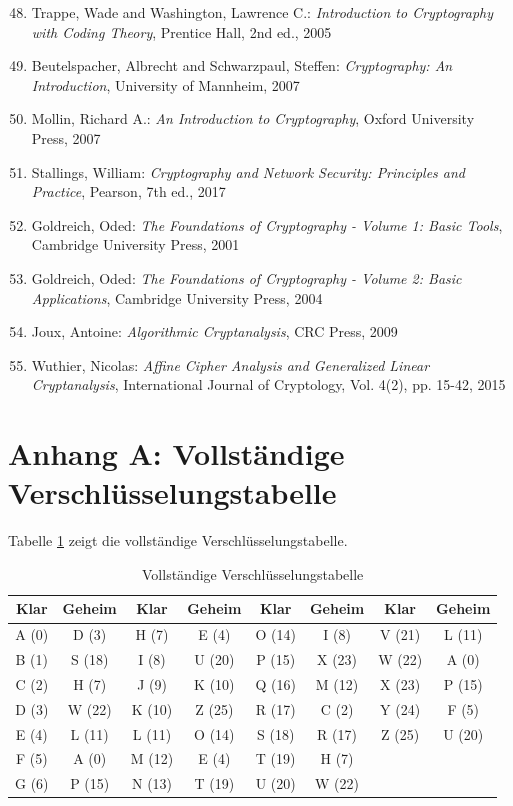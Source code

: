 ﻿\documentclass[12pt,a4paper]{article}
\begin{document}
	\begin{enumerate}
		\setcounter{enumi}{47}
		\item Trappe, Wade and Washington, Lawrence C.: \textit{Introduction to Cryptography with Coding Theory}, Prentice Hall, 2nd ed., 2005
		\item Beutelspacher, Albrecht and Schwarzpaul, Steffen: \textit{Cryptography: An Introduction}, University of Mannheim, 2007
		\item Mollin, Richard A.: \textit{An Introduction to Cryptography}, Oxford University Press, 2007
		\item Stallings, William: \textit{Cryptography and Network Security: Principles and Practice}, Pearson, 7th ed., 2017
	\end{enumerate}
	
	\begin{enumerate}
		\setcounter{enumi}{51}
		\item Goldreich, Oded: \textit{The Foundations of Cryptography - Volume 1: Basic Tools}, Cambridge University Press, 2001
		\item Goldreich, Oded: \textit{The Foundations of Cryptography - Volume 2: Basic Applications}, Cambridge University Press, 2004
		\item Joux, Antoine: \textit{Algorithmic Cryptanalysis}, CRC Press, 2009
		\item Wuthier, Nicolas: \textit{Affine Cipher Analysis and Generalized Linear Cryptanalysis}, International Journal of Cryptology, Vol. 4(2), pp. 15-42, 2015
	\end{enumerate}
	
	\appendix
	
	\section{Anhang A: Vollständige Verschlüsselungstabelle}
	Tabelle \ref{tab:full-chiffre} zeigt die vollständige Verschlüsselungstabelle.
	\begin{table}[H]
		\caption{Vollständige Verschlüsselungstabelle}
		\label{tab:full-chiffre}
		\centering
		\small
		\begin{tabular}{|c|c|c|c|c|c|c|c|}
			\hline
			\textbf{Klar} & \textbf{Geheim} & \textbf{Klar} & \textbf{Geheim} & \textbf{Klar} & \textbf{Geheim} & \textbf{Klar} & \textbf{Geheim} \\
			\hline
			A (0) & D (3) & H (7) & E (4) & O (14) & I (8) & V (21) & L (11) \\
			B (1) & S (18) & I (8) & U (20) & P (15) & X (23) & W (22) & A (0) \\
			C (2) & H (7) & J (9) & K (10) & Q (16) & M (12) & X (23) & P (15) \\
			D (3) & W (22) & K (10) & Z (25) & R (17) & C (2) & Y (24) & F (5) \\
			E (4) & L (11) & L (11) & O (14) & S (18) & R (17) & Z (25) & U (20) \\
			F (5) & A (0) & M (12) & E (4) & T (19) & H (7) & & \\
			G (6) & P (15) & N (13) & T (19) & U (20) & W (22) & & \\
			\hline
		\end{tabular}
	\end{table}
	
\end{document}
